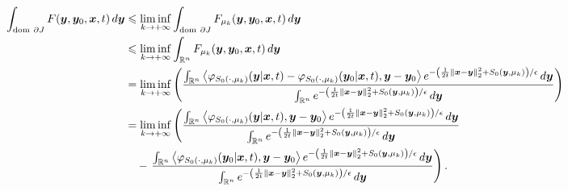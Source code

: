 \begin{equation}\label{eq:appD_limit1}
\begin{alignedat}{1}
    \int_{\dom \partial J}F(\by,\by_0,\bx,t) \diff\by &\leqslant \liminf_{k \to +\infty} \int_{\dom\partial J} F_{\mu_k}(\by,\by_0,\bx,t) \diff\by \\
    &\leqslant \liminf_{k \to +\infty} \int_{\Rn} F_{\mu_k}(\by,\by_0,\bx,t) \diff\by \\
    &= \liminf_{k \to +\infty} \left(\frac{\int_{\Rn} \left\langle \varphi_{S_0(\cdot,\mu_k)}(\by|\bx,t)-\varphi_{S_0(\cdot,\mu_k)}(\by_0|\bx,t),\by-\by_{0}\right\rangle e^{-\left(\frac{1}{2t}\left \Vert \bx - \by \right \Vert_{2}^{2} + S_0(\by,\mu_k)\right)/\epsilon} \diff \by}{\int_{\Rn}e^{-\left(\frac{1}{2t}\left \Vert \bx - \by \right \Vert_{2}^{2} + S_0(\by,\mu_k)\right)/\epsilon} \diff{\by}}\right) \\
    &= \liminf_{k \to +\infty} \left(\frac{\int_{\Rn} \left\langle \varphi_{S_0(\cdot,\mu_k)}(\by|\bx,t),\by-\by_{0}\right\rangle e^{-\left(\frac{1}{2t}\left \Vert \bx - \by \right \Vert_{2}^{2} + S_0(\by,\mu_k)\right)/\epsilon} \diff \by}{\int_{\Rn}e^{-\left(\frac{1}{2t}\left \Vert \bx - \by \right \Vert_{2}^{2} + S_0(\by,\mu_k)\right)/\epsilon} \diff{\by}} \right. \\
    &\quad - \left. \frac{\int_{\Rn} \left\langle \varphi_{S_0(\cdot,\mu_k)}(\by_0|\bx,t),\by-\by_{0}\right\rangle e^{-\left(\frac{1}{2t}\left \Vert \bx - \by \right \Vert_{2}^{2} + S_0(\by,\mu_k)\right)/\epsilon} \diff \by}{\int_{\Rn}e^{-\left(\frac{1}{2t}\left \Vert \bx - \by \right \Vert_{2}^{2} + S_0(\by,\mu_k)\right)/\epsilon} \diff{\by}} \right).
\end{alignedat}
\end{equation}

